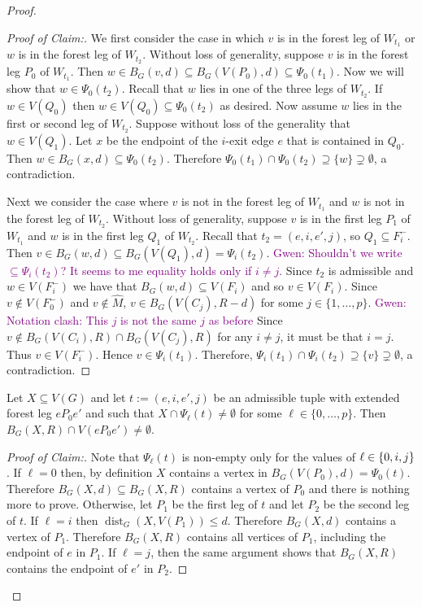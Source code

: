 \documentclass{patmorin}
\newcommand{\gwen}[1]{\textcolor{Purple}{Gwen: #1}}
\newenvironment{clmproof}{\begin{proof}[Proof of Claim:]\renewcommand{\qedsymbol}{\rule{1ex}{1ex}}}{\end{proof}}
\DeclareMathOperator{\dist}{dist}
\DeclarePairedDelimiter\set{\{}{\}}
\begin{document}
\begin{proof}
\begin{clmproof}
  We first consider the case in which $v$ is in the forest leg of $W_{t_1}$ or $w$ is in the forest leg of $W_{t_2}$.   Without loss of generality, suppose $v$ is in the forest leg $P_0$ of $W_{t_1}$. 
  Then $w\in B_G(v,d)\subseteq B_G(V(P_0),d)\subseteq\Psi_0(t_1)$.  Now we will show that $w\in \Psi_0(t_2)$.   Recall that $w$ lies in one of the three legs of $W_{t_2}$. 
  If $w\in V(Q_0)$ then $w\in V(Q_0)\subseteq \Psi_0(t_2)$ as desired. 
  Now assume $w$ lies in the first or second leg of $W_{t_2}$.
  Suppose without loss of the generality that $w\in V(Q_1)$. 
  Let $x$ be the endpoint of the $i$-exit edge $e$ that is contained in $Q_0$.
  Then $w\in B_G(x,d)\subseteq\Psi_0(t_2)$.
  Therefore $\Psi_0(t_1)\cap\Psi_0(t_2)\supseteq\{w\}\supsetneq\emptyset$, a contradiction. 

  Next we consider the case where $v$ is not in the forest leg of $W_{t_1}$ and $w$ is not in the forest leg of $W_{t_2}$.  Without loss of generality, suppose $v$ is in the first leg $P_1$ of $W_{t_1}$ and $w$ is in the first leg $Q_1$ of $W_{t_2}$. 
  Recall that $t_2=(e,i,e',j)$, so $Q_1\subseteq F_i^-$. 
  Then $v\in B_G(w,d)\subseteq B_G(V(Q_1),d) = \Psi_i(t_2)$.  
  \gwen{Shouldn't we write $\subseteq \Psi_i(t_2)$? It seems to me equality holds only if $i\neq j$.}
  Since $t_2$ is admissible and $w\in V(F^-_i)$ we have that $B_G(w,d) \subseteq V(F_i)$ and so $v\in V(F_i)$. 
  Since $v\not\in V(F_0^-)$ and $v\not\in \widehat{M}$, 
  $v\in B_G(V(C_j),R-d)$ for some $j\in\{1,\ldots,p\}$. 
  \gwen{Notation clash: This $j$ is not the same $j$ as before}
  Since $v\notin B_G(V(C_i),R)\cap B_G(V(C_j),R)$ for any $i\neq j$, it must be that $i=j$. Thus $v\in V(F^-_i)$.  Hence $v\in\Psi_i(t_1)$.
  Therefore, $\Psi_i(t_1)\cap\Psi_i(t_2)\supseteq\{v\}\supsetneq \emptyset$, a contradiction. 
\end{clmproof}


\begin{clm}\label{hungarians_hit}
  Let $X\subseteq V(G)$ and let $t:=(e,i,e',j)$ be an admissible tuple with extended forest leg $eP_0e'$ and such that $X\cap \Psi_\ell(t)\neq\emptyset$ for some $\ell\in\{0,\ldots,p\}$.  Then $B_G(X,R)\cap V(eP_0e')\neq\emptyset$.
\end{clm}

\begin{clmproof}
  Note that $\Psi_{\ell}(t)$ is non-empty only for the values of $\ell\in\set{0,i,j}$. 
  If $\ell=0$ then, by definition $X$ contains a vertex in $B_G(V(P_0),d)=\Psi_0(t)$.  Therefore $B_G(X,d)\subseteq B_G(X,R)$ contains a vertex of $P_0$ and there is nothing more to prove.
  Otherwise, let $P_1$ be the first leg of $t$ and let $P_2$ be the second leg of $t$.
  If $\ell=i$ then $\dist_G(X,V(P_1))\le d$.  Therefore $B_G(X,d)$ contains a vertex of $P_1$.  Therefore $B_G(X,R)$ contains all vertices of $P_1$, including the endpoint of $e$ in $P_1$.  If $\ell=j$, then the same argument shows that $B_G(X,R)$ contains the endpoint of $e'$ in $P_2$.
\end{clmproof}


\end{proof}
\end{document}
